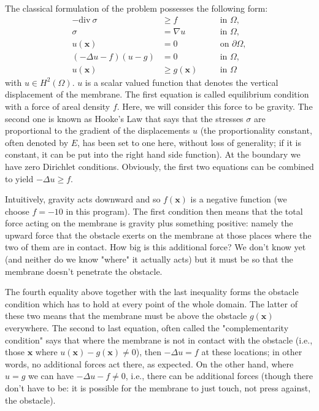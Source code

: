 \documentclass{article}
\begin{document}
The classical formulation of the problem possesses the following form:
\begin{align*}
 -\textrm{div}\ \sigma &\geq f & &\quad\text{in } \Omega,\\
 \sigma &= \nabla u & &\quad\text{in } \Omega,\\
 u(\mathbf x) &= 0 & &\quad\text{on }\partial\Omega,\\
(-\Delta u - f)(u - g) &= 0 & &\quad\text{in } \Omega,\\
 u(\mathbf x) &\geq g(\mathbf x) & &\quad\text{in } \Omega
\end{align*}
with $u\in H^2(\Omega)$.  $u$ is a scalar valued function that denotes the
vertical displacement of the membrane. The first equation is called equilibrium
condition with a force of areal density $f$. Here, we will consider this force
to be gravity. The second one is known as Hooke's Law that says that the stresses
$\sigma$ are proportional to the gradient of the displacements $u$ (the
proportionality constant, often denoted by $E$, has been set to one here,
without loss of generality; if it is constant, it can be put into the right
hand side function). At the boundary we have zero Dirichlet
conditions. Obviously, the first two equations can be combined to yield
$-\Delta u \ge f$.

Intuitively, gravity acts downward and so $f(\mathbf x)$ is a negative
function (we choose $f=-10$ in this program). The first condition then means
that the total force acting on the membrane is gravity plus something
positive: namely the upward force that the obstacle exerts on the membrane at
those places where the two of them are in contact. How big is this additional
force? We don't know yet (and neither do we know "where" it actually acts) but
it must be so that the membrane doesn't penetrate the obstacle.

The fourth equality above together with the last inequality forms the obstacle
condition which has to hold at every point of the whole domain. The latter of
these two means that the membrane must be above the obstacle $g(\mathbf x)$
everywhere. The second to last equation, often called the "complementarity
condition" says that where the membrane is not in contact with the obstacle
(i.e., those $\mathbf x$ where $u(\mathbf x) - g(\mathbf x) \neq 0$), then
$-\Delta u=f$ at these locations; in other words, no additional forces act
there, as expected. On the other hand, where $u=g$ we can have $-\Delta u-f
\neq 0$, i.e., there can be additional forces (though there don't have to be:
it is possible for the membrane to just touch, not press against, the
obstacle).
\end{document}
